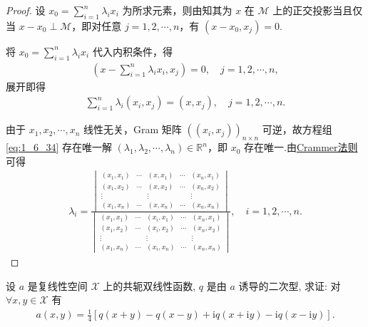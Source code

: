 \documentclass[../../main.tex]{subfiles}%
\begin{document}
\begin{proof}
设 $x_0 = \sum\limits_{i=1}^{n} \lambda_i x_i$ 为所求元素，则由知其为 $x$ 在 $\mathscr{M}$ 上的正交投影当且仅当 $x - x_0 \perp \mathscr{M}$，即对任意 $j = 1, 2, \cdots, n$，有 $(x - x_0, x_j) = 0$.

将 $x_0 = \sum\limits_{i=1}^{n} \lambda_i x_i$ 代入内积条件，得
\begin{align*}
\left( x - \sum\limits_{i=1}^{n} \lambda_i x_i, x_j \right) = 0, \quad j = 1, 2, \cdots, n,
\end{align*}
展开即得
\begin{align}
\sum\limits_{i=1}^{n} \lambda_i (x_i, x_j) = (x, x_j), \quad j = 1, 2, \cdots, n. \label{eq:1_6_34}
\end{align}

由于 $x_1, x_2, \cdots, x_n$ 线性无关，Gram 矩阵 $((x_i, x_j))_{n \times n}$ 可逆，故方程组 \eqref{eq:1_6_34} 存在唯一解 $(\lambda_1, \lambda_2, \cdots, \lambda_n) \in \mathbb{R}^n$，即 $x_0$ 存在唯一.由\hyperref[Basis of Algebra-theorem:Crammer法则]{Crammer法则}可得
\begin{align*}
\lambda_i = \frac{
\begin{vmatrix}
(x_1, x_1) & \cdots & (x, x_1) & \cdots & (x_n, x_1) \\
(x_1, x_2) & \cdots & (x, x_2) & \cdots & (x_n, x_2) \\
\vdots & & \vdots & & \vdots \\
(x_1, x_n) & \cdots & (x, x_n) & \cdots & (x_n, x_n)
\end{vmatrix}
}{
\begin{vmatrix}
(x_1, x_1) & \cdots & (x_i, x_1) & \cdots & (x_n, x_1) \\
(x_1, x_2) & \cdots & (x_i, x_2) & \cdots & (x_n, x_2) \\
\vdots & & \vdots & & \vdots \\
(x_1, x_n) & \cdots & (x_i, x_n) & \cdots & (x_n, x_n)
\end{vmatrix}
}, \quad i = 1, 2, \cdots, n.
\end{align*}
\end{proof}


\begin{proposition}[极化恒等式]
设 $a$ 是复线性空间 $\mathscr{X}$ 上的共轭双线性函数, $q$ 是由 $a$ 诱导的二次型, 求证: 对 $\forall x,y\in\mathscr{X}$ 有
\begin{align*}
a(x,y)=\frac{1}{4}\left[q(x+y)-q(x-y)+\mathrm{i}q(x+\mathrm{i}y)-\mathrm{i}q(x-\mathrm{i}y)\right].
\end{align*}
\end{proposition}
\end{document}
